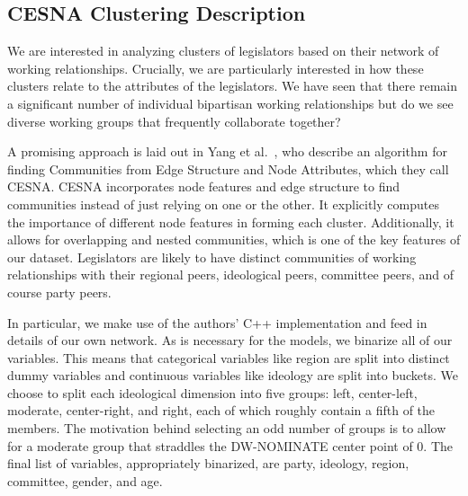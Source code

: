 \subsection{CESNA Clustering Description}

We are interested in analyzing clusters of legislators based on their network of
working relationships. Crucially, we are particularly interested in how these
clusters relate to the attributes of the legislators. We have seen that there
remain a significant number of individual bipartisan working relationships but
do we see diverse working groups that frequently collaborate together?

A promising approach is laid out in Yang et al.~\cite{Yang}, who describe an
algorithm for finding Communities from Edge Structure and Node Attributes, which
they call CESNA. CESNA incorporates node features and edge structure to find
communities instead of just relying on one or the other. It explicitly computes
the importance of different node features in forming each cluster. Additionally,
it allows for overlapping and nested communities, which is one of the key
features of our dataset. Legislators are likely to have distinct communities of
working relationships with their regional peers, ideological peers, committee
peers, and of course party peers.

In particular, we make use of the authors' C++ implementation and feed in
details of our own network. As is necessary for the models, we binarize all of
our variables. This means that categorical variables like region are split into
distinct dummy variables and continuous variables like ideology are split into
buckets. We choose to split each ideological dimension into five groups: left,
center-left, moderate, center-right, and right, each of which roughly contain a
fifth of the members. The motivation behind selecting an odd number of groups is
to allow for a moderate group that straddles the DW-NOMINATE center point of 0.
The final list of variables, appropriately binarized, are party, ideology,
region, committee, gender, and age.
